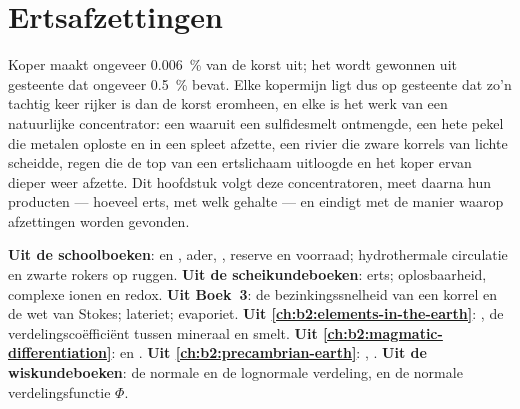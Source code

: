 \chapter{Ertsafzettingen}\label{ch:b2:ore-deposits}

Koper maakt ongeveer \qty{0.006}{\percent} van de korst uit; het wordt gewonnen uit gesteente dat ongeveer
\qty{0.5}{\percent} bevat. Elke kopermijn ligt dus op gesteente dat zo'n tachtig keer rijker is dan de
korst eromheen, en elke  is het werk van een natuurlijke concentrator: een  waaruit
een sulfidesmelt ontmengde, een hete pekel die metalen oploste en in een spleet afzette, een
rivier die zware korrels van lichte scheidde, regen die de top van een ertslichaam uitloogde en
het koper ervan dieper weer afzette. Dit hoofdstuk volgt deze concentratoren, meet daarna hun
producten --- hoeveel erts, met welk gehalte --- en eindigt met de manier waarop afzettingen worden gevonden.

\begin{recall}
\textbf{Uit de schoolboeken}:  en , ader, , reserve en
voorraad; hydrothermale circulatie en zwarte rokers op ruggen. \textbf{Uit de
scheikundeboeken}: erts; oplosbaarheid, complexe ionen en redox. \textbf{Uit Boek~3}: de
bezinkingssnelheid van een korrel en de wet van Stokes; lateriet; evaporiet. \textbf{Uit
\cref{ch:b2:elements-in-the-earth}}: , de verdelingscoëfficiënt tussen
mineraal en smelt. \textbf{Uit \cref{ch:b2:magmatic-differentiation}}:  en
. \textbf{Uit \cref{ch:b2:precambrian-earth}}: , .
\textbf{Uit de wiskundeboeken}: de normale en de lognormale verdeling, en de normale
verdelingsfunctie $\Phi$.
\end{recall}

